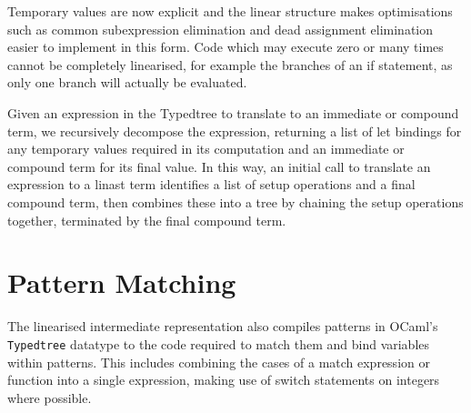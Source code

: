%

Temporary values are now explicit and the linear structure makes optimisations such as common subexpression elimination and dead assignment elimination easier to implement in this form. Code which may execute zero or many times cannot be completely linearised, for example the branches of an if statement, as only one branch will actually be evaluated. 

Given an expression in the Typedtree to translate to an immediate or compound term, we recursively decompose the expression, returning a list of let bindings for any temporary values required in its computation and an immediate or compound term for its final value. In this way, an initial call to translate an expression to a linast term identifies a list of setup operations and a final compound term, then combines these into a tree by chaining the setup operations together, terminated by the final compound term.




\section{Pattern Matching}
The linearised intermediate representation also compiles patterns in OCaml's \verb|Typedtree| datatype to the code required to match them and bind variables within patterns. This includes combining the cases of a match expression or function into a single expression, making use of switch statements on integers where possible. 

